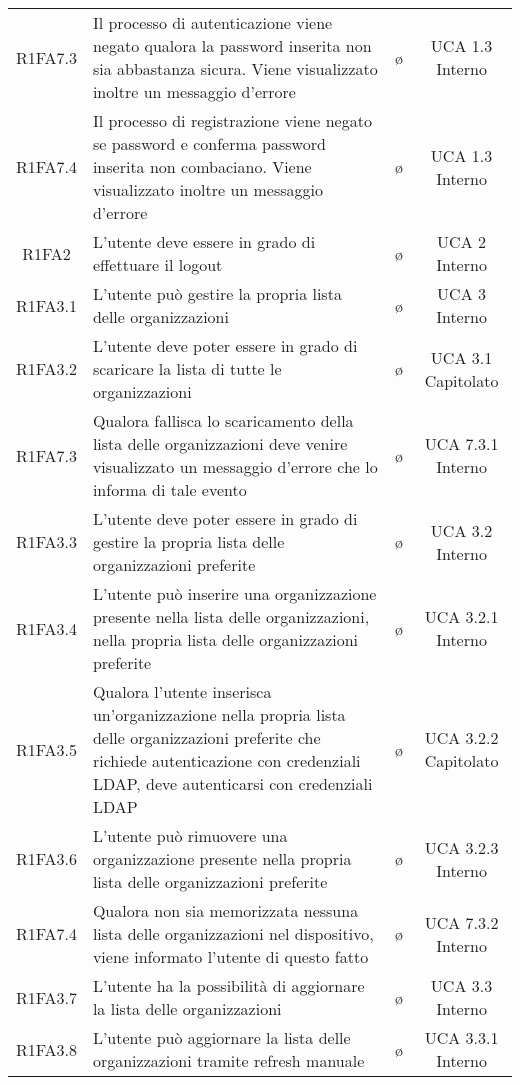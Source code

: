 {\begin{longtable}{ c C{4cm} c c}
R1FA7.3 & Il processo di autenticazione viene negato qualora la password inserita non sia abbastanza sicura. Viene visualizzato inoltre un messaggio d'errore & \o & UCA 1.3 Interno\\

R1FA7.4 & Il processo di registrazione viene negato se password e conferma password inserita non combaciano. Viene visualizzato inoltre un messaggio d'errore & \o & UCA 1.3 Interno\\


R1FA2 & L'utente deve essere in grado di effettuare il logout & \o & UCA 2 Interno\\
R1FA3.1 & L'utente può gestire la propria lista delle organizzazioni& \o & UCA 3 Interno\\
R1FA3.2 & L'utente deve poter essere in grado di scaricare la lista di tutte le organizzazioni & \o & UCA 3.1 Capitolato \\
R1FA7.3 & Qualora fallisca lo scaricamento della lista delle organizzazioni deve venire visualizzato un messaggio d'errore che lo informa di tale evento & \o & UCA 7.3.1 Interno \\
R1FA3.3 & L’utente deve poter essere in grado di gestire la propria lista delle organizzazioni preferite & \o & UCA 3.2 Interno \\
R1FA3.4 & L’utente può inserire una organizzazione presente nella lista delle organizzazioni, nella propria lista delle organizzazioni preferite & \o & UCA 3.2.1 Interno \\
R1FA3.5 & Qualora l’utente inserisca un'organizzazione nella propria lista delle organizzazioni preferite che richiede autenticazione con credenziali LDAP, deve autenticarsi con credenziali LDAP & \o & UCA 3.2.2 Capitolato\\
R1FA3.6 & L’utente può rimuovere una organizzazione presente nella propria lista delle organizzazioni preferite & \o & UCA 3.2.3 Interno \\
R1FA7.4 & Qualora non sia memorizzata nessuna lista delle organizzazioni nel dispositivo, viene informato l’utente di questo fatto & \o & UCA 7.3.2 Interno \\
R1FA3.7 & L’utente ha la possibilità di aggiornare la lista delle organizzazioni & \o & UCA 3.3 Interno \\
R1FA3.8 & L’utente può aggiornare la lista delle organizzazioni tramite refresh manuale & \o & UCA 3.3.1 Interno \\

\end{longtable}}
